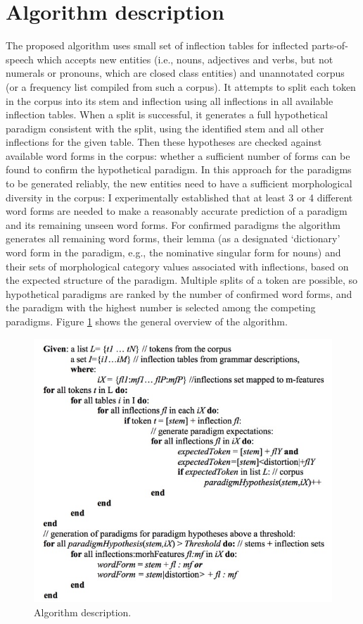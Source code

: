 \documentclass[11pt,a4paper]{article}
\begin{document}
\section{Algorithm description}
\label{sec:Algorithm}

The proposed algorithm uses small set of inflection tables for inflected parts-of-speech which accepts new entities (i.e., nouns, adjectives and verbs, but not numerals or pronouns, which are closed class entities) and unannotated corpus (or a frequency list compiled from such a corpus). It attempts to split each token in the corpus into its stem and inflection using all inflections in all available inflection tables. When a split is successful, it generates a full hypothetical paradigm consistent with the split, using the identified stem and all other inflections for the given table. Then these hypotheses are checked against available word forms in the corpus: whether a sufficient number of forms can be found to confirm the hypothetical paradigm. In this approach for the paradigms to be generated reliably, the new entities need to have a sufficient morphological diversity in the corpus: I experimentally established that at least 3 or 4 different word forms are needed to make a reasonably accurate prediction of a paradigm and its remaining unseen word forms. For confirmed paradigms the algorithm generates all remaining word forms, their lemma (as a designated `dictionary' word form in the paradigm, e.g., the nominative singular form for nouns) and their sets of morphological category values associated with inflections, based on the expected structure of the paradigm. Multiple splits of a token are possible, so hypothetical paradigms are ranked by the number of confirmed word forms, and the paradigm with the highest number is selected among the competing paradigms. Figure \ref{fig:alg1} shows the general overview of the algorithm.

\begin{figure}
	\includegraphics[width=\linewidth]{algorithm-description.jpg}
	\caption{Algorithm description.}
	\label{fig:alg1}
\end{figure}
\end{document}
